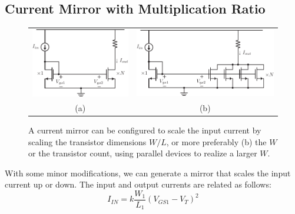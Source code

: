 \subsection{Current Mirror with Multiplication Ratio} \label{sec:interdigitate}
\begin{figure}[tb]
\centering
\begin{tabular}{cc}
\includegraphics[scale=.8]{6mirror_105_amp.pdf} &
\includegraphics[scale=.8]{6mirror_105_amp_Ncopies.pdf}\\
(a) & (b)\\
\end{tabular}
\caption{A current mirror can be configured to scale the input current by scaling the transistor dimensions $W/L$, or more preferably (b) the $W$ or the transistor count, using parallel devices to realize a larger $W$.}
\label{fig:6mirror_105_amp.pdf}
\end{figure}
With some minor modifications, we can generate a mirror that scales the input current up or down. The input and output currents are related as follows:
    \begin{equation}
        {I_{IN}} = k\frac{{{W_1}}}{{{L_1}}}{({V_{GS1}} - {V_T})^2}
    \end{equation}
